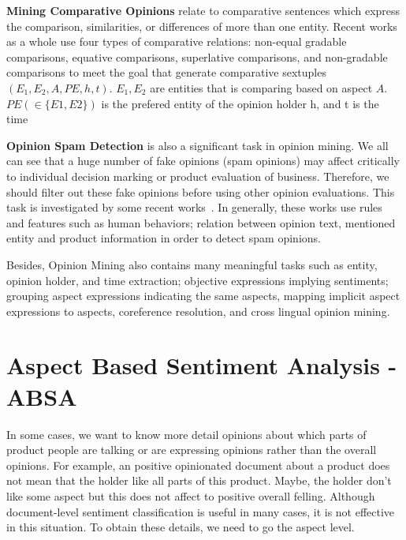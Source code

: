 \documentclass{article}
\begin{document}
\textbf{Mining Comparative Opinions} relate to comparative sentences which express the comparison, similarities, or differences of more than one entity.
		Recent works~\cite{Dave:2003:MPG:775152.775226,Ding:2009:EDA:1557019.1557141, Ganapathibhotla:2008:MOC:1599081.1599112,Jindal:2006:MCS:1597348.1597400} as a whole use four types of comparative relations: non-equal gradable comparisons, equative comparisons, superlative comparisons, and non-gradable comparisons to meet the goal that generate comparative sextuples $(E_1, E_2, A, PE, h, t)$.
		$E_1,E_2$ are entities that is comparing based on aspect $A$.
		$PE (\in \{E1, E2\})$ is the prefered entity of the opinion holder h, and t is the time
		
\textbf{Opinion Spam Detection} is also a significant task in opinion mining.
		We all can see that a huge number of fake opinions (spam opinions) may affect critically to individual decision marking or product evaluation of business.
		Therefore, we should filter out these fake opinions before using other opinion evaluations.
		This task is investigated by some recent works~\cite{Jindal:2008:OSA:1341531.1341560,Jindal:2007:RSD:1242572.1242759,Lim:2010:DPR:1871437.1871557,Mukherjee:2011:DGR:1963192.1963240}.
		In generally, these works use rules and features such as human behaviors; relation between opinion text, mentioned entity and product information in order to detect spam opinions.
		
Besides, Opinion Mining also contains many meaningful tasks such as entity, opinion holder, and time extraction; objective expressions implying sentiments; grouping aspect expressions indicating the same aspects, mapping implicit aspect expressions to aspects, coreference resolution, and cross lingual opinion mining.

\section{Aspect Based Sentiment Analysis - ABSA}
\label{sec:sbsa}

In some cases, we want to know more detail opinions about which parts of product people are talking or are expressing opinions rather than the overall opinions.
For example, an positive opinionated document about a product does not mean that the holder like all parts of this product.
Maybe, the holder don't like some aspect	 but this does not affect to positive overall felling.
Although document-level sentiment classification is useful in many cases, it is not effective in this situation. 
To obtain these details, we need to go the aspect level.
\end{document}
